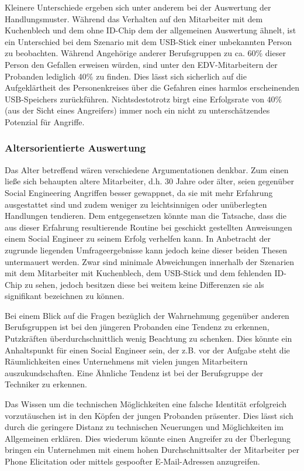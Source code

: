 Kleinere Unterschiede ergeben sich unter anderem bei der Auswertung der Handlungsmuster.
Während das Verhalten auf den Mitarbeiter mit dem Kuchenblech und dem ohne ID-Chip dem der allgemeinen Auswertung ähnelt, ist ein Unterschied bei dem Szenario mit dem USB-Stick einer unbekannten Person zu beobachten.
Während Angehörige anderer Berufsgruppen zu ca. 60\% dieser Person den Gefallen erweisen würden, sind unter den EDV-Mitarbeitern der Probanden lediglich 40\% zu finden.
Dies lässt sich sicherlich auf die Aufgeklärtheit des Personenkreises über die Gefahren eines harmlos erscheinenden USB-Speichers zurückführen.
Nichtsdestotrotz birgt eine Erfolgsrate von 40\% (aus der Sicht eines Angreifers) immer noch ein nicht zu unterschätzendes Potenzial für Angriffe.

\subsubsection{Altersorientierte Auswertung}\label{ref:altersorientierte-auswertung}

Das Alter betreffend wären verschiedene Argumentationen denkbar.
Zum einen ließe sich behaupten altere Mitarbeiter, d.h. 30 Jahre oder älter, seien gegenüber Social Engineering Angriffen besser gewappnet, da sie mit mehr Erfahrung ausgestattet sind und zudem weniger zu leichtsinnigen oder unüberlegten Handlungen tendieren.
Dem entgegensetzen könnte man die Tatsache, dass die aus dieser Erfahrung resultierende Routine bei geschickt gestellten Anweisungen einem Social Engineer zu seinem Erfolg verhelfen kann.
In Anbetracht der zugrunde liegenden Umfrageergebnisse kann jedoch keine dieser beiden Thesen untermauert werden.
Zwar sind minimale Abweichungen innerhalb der Szenarien mit dem Mitarbeiter mit Kuchenblech, dem USB-Stick und dem fehlenden ID-Chip zu sehen, jedoch besitzen diese bei weitem keine Differenzen sie als signifikant bezeichnen zu können.

Bei einem Blick auf die Fragen bezüglich der Wahrnehmung gegenüber anderen Berufsgruppen ist bei den jüngeren Probanden eine Tendenz zu erkennen, Putzkräften überdurchschnittlich wenig Beachtung zu schenken.
Dies könnte ein Anhaltspunkt für einen Social Engineer sein, der z.B. vor der Aufgabe steht die Räumlichkeiten eines Unternehmens mit vielen jungen Mitarbeitern auszukundschaften.
Eine Ähnliche Tendenz ist bei der Berufsgruppe der Techniker zu erkennen.

Das Wissen um die technischen Möglichkeiten eine falsche Identität erfolgreich vorzutäuschen ist in den Köpfen der jungen Probanden präsenter.
Dies lässt sich durch die geringere Distanz zu technischen Neuerungen und Möglichkeiten im Allgemeinen erklären.
Dies wiederum könnte einen Angreifer zu der Überlegung bringen ein Unternehmen mit einem hohen Durchschnittsalter der Mitarbeiter per Phone Elicitation oder mittels gespoofter E-Mail-Adressen anzugreifen.

